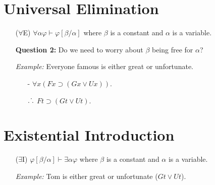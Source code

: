 \documentclass[a4paper, 11pt]{article} %
\def\therefore{\ensuremath{\ldotp\dot\,\ldotp}}
\newcommand{\unisub}[2]{[#1/#2]}
\begin{document}
\section*{Universal Elimination}

\begin{enumerate}
  \item[($\forall$E)] $\forall\alpha\varphi \vdash \varphi\unisub{\beta}{\alpha}$ where $\beta$ is a constant and $\alpha$ is a variable. 
  \item[\bf Question 2:] Do we need to worry about $\beta$ being free for $\alpha$? 
  \item[\it Example:] Everyone famous is either great or unfortunate.
    \begin{itemize}
      \item[-] $\forall x(Fx \supset (Gx \vee Ux))$.
      \item[$\therefore$] $Ft \supset (Gt \vee Ut)$.
    \end{itemize}
\end{enumerate}




\section*{Existential Introduction}

\begin{enumerate}
  \item[($\exists$I)] $\varphi\unisub{\beta}{\alpha} \vdash \exists\alpha\varphi$ where $\beta$ is a constant and $\alpha$ is a variable. 
  \item[\it Example:] Tom is either great or unfortunate ($Gt \vee Ut$).
    \begin{itemize}
    \end{itemize}
\end{enumerate}
\end{document}
